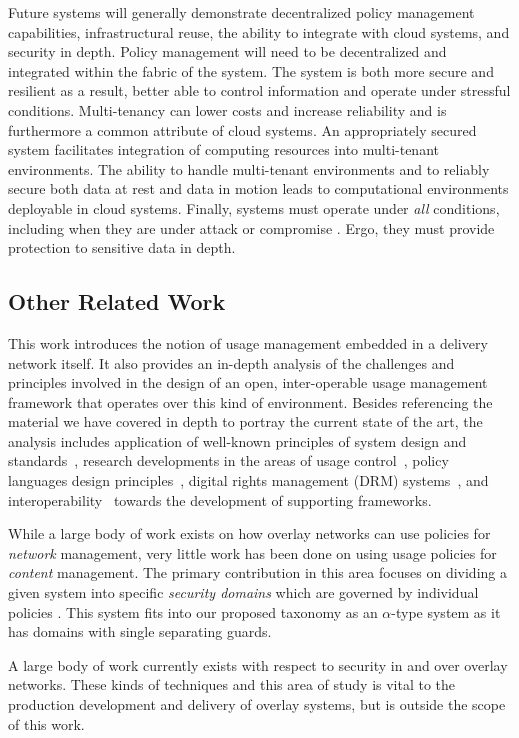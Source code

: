 Future systems will generally demonstrate decentralized policy management capabilities, infrastructural reuse, the ability to integrate with cloud systems, and security in depth.  Policy management will need to be decentralized and integrated within the fabric of the system.  The system is both more secure and resilient as a result, better able to control information and operate under stressful conditions.  Multi-tenancy can lower costs and increase reliability and is furthermore a common attribute of cloud systems.  An appropriately secured system facilitates integration of computing resources into multi-tenant environments.  The ability to handle multi-tenant environments and to reliably secure both data at rest and data in motion leads to computational environments deployable in cloud systems.  Finally, systems must operate under \textit{all} conditions, including when they are under attack or compromise \cite{proposal:ron-ross}.  Ergo, they must provide protection to sensitive data in depth.

\subsection{Other Related Work}
This work introduces the notion of usage management embedded in a delivery network itself.  It also provides an in-depth analysis of the challenges and principles involved in the design of an open, inter-operable usage management framework that operates over this kind of environment. Besides referencing the material we have covered in depth to portray the current state of the art, the analysis includes application of well-known principles of system design and standards~\cite{BlCl:01,Cl:88,ClWrSoBr:02}, research developments in the areas of usage control~\cite{PaSa:04,JaHeLa:10}, policy languages design principles~\cite{JaHeMa:06}, digital rights management (DRM) systems~\cite{JaHe:09},  and interoperability~\cite{JaHe:04,HeJa:05,KoLaMaMi:04,coral,marlin} towards the development of supporting frameworks.

While a large body of work exists on how overlay networks can use policies for \textit{network} management, very little work has been done on using usage policies for \textit{content} management.  The primary contribution in this area focuses on dividing a given system into specific \textit{security domains} which are governed by individual policies \cite{4457175}.  This system fits into our proposed taxonomy as an $\alpha$-type system as it has domains with single separating guards.

A large body of work currently exists with respect to security in and over overlay networks.  These kinds of techniques and this area of study is vital to the production development and delivery of overlay systems, but is outside the scope of this work.